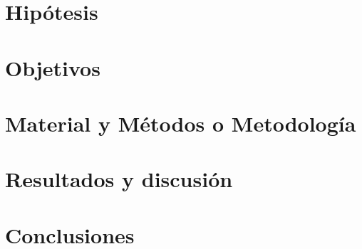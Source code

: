 \documentclass[12pt, letterpaper, spanish, twoside]{article}
\begin{document}
\section{Hipótesis}


\section{Objetivos}


\section{Material y Métodos o Metodología}


\section{Resultados y discusión}


\section{Conclusiones}




\nocite{*} %
\renewcommand{\refname}{Referencias bibliográficas}

%

\end{document}

